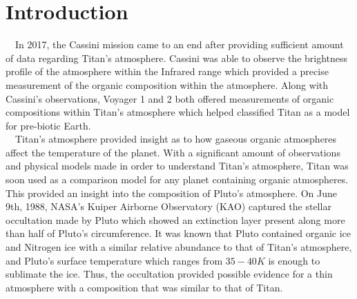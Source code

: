 \documentclass[useAMS,natbib]{mn2e}
\begin{document}
\section{Introduction} %
\indent~~In 2017, the Cassini mission came to an end after providing sufficient amount of data regarding Titan's atmosphere. Cassini was able to observe the brightness profile of the atmosphere within the Infrared range which provided a precise measurement of the organic composition within the atmosphere. Along with Cassini's observations, Voyager 1 and 2 both offered measurements of organic compositions within Titan's atmosphere which helped classified Titan as a model for pre-biotic Earth.\cite{TitanVerticalAerosol}\\
\indent~~Titan's atmosphere provided insight as to how gaseous organic atmospheres affect the temperature of the planet. With a significant amount of observations and physical models made in order to understand Titan's atmosphere, Titan was soon used as a comparison model for any planet containing organic atmospheres. This provided an insight into the composition of Pluto's atmosphere. On June 9th, 1988, NASA's Kuiper Airborne Observatory (KAO) captured the stellar occultation made by Pluto which showed an extinction layer present along more than half of Pluto's circumference. It was known that Pluto contained organic ice and Nitrogen ice with a similar relative abundance to that of Titan's atmosphere, and Pluto's surface temperature which ranges from $35-40 K$ is enough to sublimate the ice. Thus, the occultation provided possible evidence for a thin atmosphere with a composition that was similar to that of Titan.\\
\end{document}
